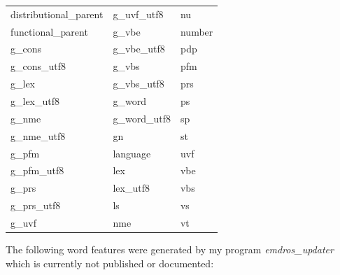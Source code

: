 \documentclass[11pt,oneside,a4paper]{memoir}
\begin{document}
\begin{center}
  \begin{tabular}{lll}
    distributional\_parent & g\_uvf\_utf8  & nu    \\
    functional\_parent     & g\_vbe        & number\\
    g\_cons                & g\_vbe\_utf8  & pdp   \\
    g\_cons\_utf8          & g\_vbs        & pfm   \\
    g\_lex                 & g\_vbs\_utf8  & prs   \\
    g\_lex\_utf8           & g\_word       & ps    \\
    g\_nme                 & g\_word\_utf8 & sp    \\
    g\_nme\_utf8           & gn            & st    \\
    g\_pfm                 & language      & uvf   \\
    g\_pfm\_utf8           & lex           & vbe   \\
    g\_prs                 & lex\_utf8     & vbs   \\
    g\_prs\_utf8           & ls            & vs    \\
    g\_uvf                 & nme           & vt    \\
  \end{tabular}
\end{center}

The following word features were generated by my program \emph{emdros\_updater} which is currently
not published or documented:
\end{document}
